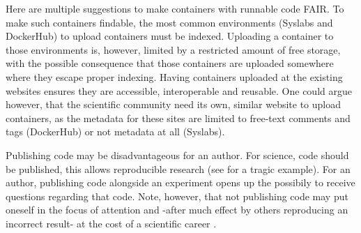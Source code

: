 
Here are multiple suggestions to make containers with runnable code FAIR.
To make such containers findable, the most common 
environments (Syslabs and DockerHub) to upload containers must be indexed.
Uploading a container to those environments is, however, limited by
a restricted amount of free storage, with the possible consequence that
those containers are uploaded somewhere where they escape proper indexing.
Having containers uploaded at the existing websites ensures they are
accessible, interoperable and reusable.
One could argue however, that the scientific community need its own,
similar website to upload containers, as the metadata for these
sites are limited to free-text comments and tags (DockerHub)
or not metadata at all (Syslabs).



Publishing code may be disadvantageous for an author.
For science, code should be published, 
this allows reproducible research 
(see \cite{haibe2020importance} for a tragic example).
For an author, publishing code alongside an experiment opens up
the possibily to receive questions regarding that code.
Note, however, that not publishing code may put 
oneself in the focus of attention
and -after much effect by others reproducing an incorrect result-
at the cost of a scientific career \cite{baggerly2009deriving}.



